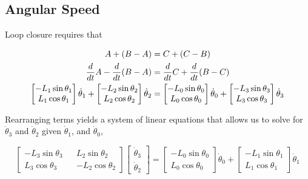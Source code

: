 \documentclass[letterpaper]{article}
\begin{document}
\subsection{Angular Speed}

Loop closure requires that

\begin{align}
	A + (B - A) &= C + (C - B) \notag \\
	\frac{d}{dt} A - \frac{d}{dt} (B - A) &= \frac{d}{dt} C + \frac{d}{dt} (B - C) \label{eq:dloop}\\
	\begin{bmatrix} -L_1 \sin \theta_1 \\ L_1 \cos \theta_1 \end{bmatrix} \dot{\theta}_1 + \begin{bmatrix} -L_2 \sin \theta_2 \\ L_2 \cos \theta_2 \end{bmatrix} \dot{\theta}_2 &= \begin{bmatrix} -L_0 \sin \theta_0 \\ L_0 \cos \theta_0 \end{bmatrix} \dot{\theta}_0 + \begin{bmatrix} -L_3 \sin \theta_3 \\ L_3 \cos \theta_3 \end{bmatrix} \dot{\theta}_3
	\end{align}

\noindent Rearranging terms yields a system of linear equations that allows us to solve for $\dot{\theta}_3$ and $\dot{\theta}_2$ given $\dot{\theta}_1$, and $\dot{\theta}_0$,

\begin{equation}
	\begin{bmatrix} -L_3 \sin \theta_3 && L_2 \sin \theta_2 \\ L_3 \cos \theta_3 && - L_2 \cos \theta_2 \end{bmatrix} \begin{bmatrix} \dot{\theta}_3 \\ \dot{\theta}_2 \end{bmatrix} = \begin{bmatrix} -L_0 \sin \theta_0 \\ L_0 \cos \theta_0 \end{bmatrix} \dot{\theta}_0 + \begin{bmatrix} -L_1 \sin \theta_1 \\ L_1 \cos \theta_1 \end{bmatrix} \dot{\theta}_1
\end{equation}
\end{document}
